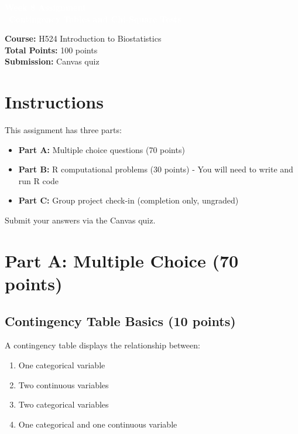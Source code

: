 \documentclass[11pt]{article}
\title{}
\author{}
\date{}
\begin{document}
\begin{tcolorbox}[colback=osaorange,colframe=black,boxrule=2pt,arc=0pt,left=6pt,right=6pt,top=10pt,bottom=10pt]
\centering
\textcolor{white}{\textbf{\Large Week 8 Assignment}}\\\
\textcolor{white}{\textbf{\large Contingency Tables and Chi-Square Tests}}
\end{tcolorbox}

\vspace{8pt}

\noindent\textbf{Course:} H524 Introduction to Biostatistics\\
\textbf{Total Points:} 100 points\\
\textbf{Submission:} Canvas quiz

\vspace{8pt}

\section*{Instructions}

This assignment has three parts:

\begin{itemize}
\item \textbf{Part A:} Multiple choice questions (70 points)
\item \textbf{Part B:} R computational problems (30 points) - You will need to write and run R code
\item \textbf{Part C:} Group project check-in (completion only, ungraded)
\end{itemize}

Submit your answers via the Canvas quiz.

\vspace{12pt}

\section{Part A: Multiple Choice (70 points)}

\subsection*{Contingency Table Basics (10 points)}
A contingency table displays the relationship between:

\begin{enumerate}[label=\Alph*.]
\item One categorical variable
\item Two continuous variables
\item Two categorical variables
\item One categorical and one continuous variable
\end{enumerate}
\end{document}
